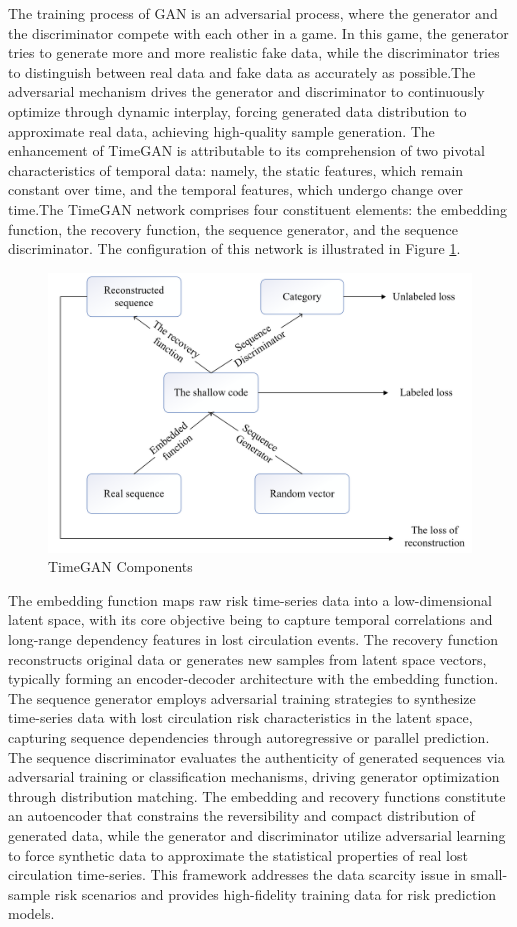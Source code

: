 \documentclass[journal,article,submit,pdftex,moreauthors]{Definitions/mdpi}
\begin{document}
The training process of GAN is an adversarial process, where the generator and the discriminator compete with each other in a game. In this game, the generator tries to generate more and more realistic fake data, while the discriminator tries to distinguish between real data and fake data as accurately as possible.The adversarial mechanism drives the generator and discriminator to continuously optimize through dynamic interplay, forcing generated data distribution to approximate real data, achieving high-quality sample generation. The enhancement of TimeGAN \cite{Yoon2019} is attributable to its comprehension of two pivotal characteristics of temporal data: namely, the static features, which remain constant over time, and the temporal features, which undergo change over time.The TimeGAN network comprises four constituent elements: the embedding function, the recovery function, the sequence generator, and the sequence discriminator. The configuration of this network is illustrated in Figure \ref{fig:timegan}.  


\begin{figure}[H]
    \centering
    \includegraphics[width=0.75\linewidth]{图片/timegan组成.png}
    \caption{TimeGAN Components}
    \label{fig:timegan}
\end{figure}

The embedding function maps raw risk time-series data into a low-dimensional latent space, with its core objective being to capture temporal correlations and long-range dependency features in lost circulation events. The recovery function reconstructs original data or generates new samples from latent space vectors, typically forming an encoder-decoder architecture with the embedding function. The sequence generator employs adversarial training strategies to synthesize time-series data with lost circulation risk characteristics in the latent space, capturing sequence dependencies through autoregressive or parallel prediction. The sequence discriminator evaluates the authenticity of generated sequences via adversarial training or classification mechanisms, driving generator optimization through distribution matching. The embedding and recovery functions constitute an autoencoder that constrains the reversibility and compact distribution of generated data, while the generator and discriminator utilize adversarial learning to force synthetic data to approximate the statistical properties of real lost circulation time-series. This framework addresses the data scarcity issue in small-sample risk scenarios and provides high-fidelity training data for risk prediction models.
\end{document}

